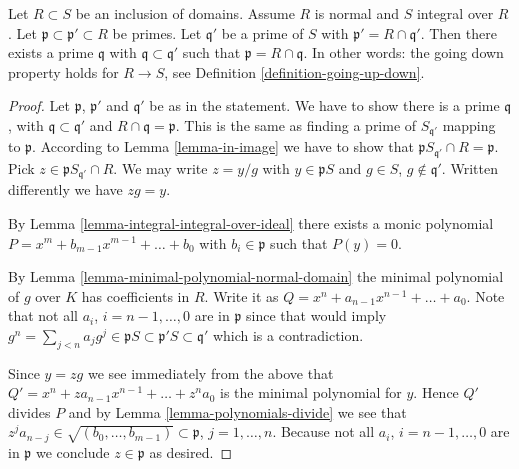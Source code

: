 \begin{proposition}
\label{proposition-going-down-normal-integral}
Let $R \subset S$ be an inclusion of domains.
Assume $R$ is normal and $S$ integral over $R$.
Let $\mathfrak p \subset \mathfrak p' \subset R$
be primes. Let $\mathfrak q'$ be a prime of $S$
with $\mathfrak p' = R \cap \mathfrak q'$.
Then there exists a prime $\mathfrak q$
with $\mathfrak q \subset \mathfrak q'$
such that $\mathfrak p = R \cap \mathfrak q$. In other words:
the going down property holds for $R \to S$, see
Definition \ref{definition-going-up-down}.
\end{proposition}

\begin{proof}
Let $\mathfrak p$, $\mathfrak p'$ and $\mathfrak q'$
be as in the statement. We have to show there is a prime
$\mathfrak q$, with $\mathfrak q \subset \mathfrak q'$ and
$R \cap \mathfrak q = \mathfrak p$. This is the same
as finding a prime of
$S_{\mathfrak q'}$ mapping to $\mathfrak p$.
According to Lemma \ref{lemma-in-image} we have to show
that $\mathfrak p S_{\mathfrak q'} \cap R
= \mathfrak p$. Pick $z \in \mathfrak p S_{\mathfrak q'} \cap R$.
We may write $z = y/g$ with $y \in \mathfrak pS$ and
$g \in S$, $g \not\in \mathfrak q'$. Written
differently we have $zg = y$.

\medskip\noindent
By Lemma \ref{lemma-integral-integral-over-ideal}
there exists a monic polynomial
$P = x^m + b_{m-1} x^{m-1} + \ldots + b_0$
with $b_i \in \mathfrak p$ such that $P(y) = 0$.

\medskip\noindent
By Lemma \ref{lemma-minimal-polynomial-normal-domain}
the minimal polynomial of $g$ over $K$ has coefficients
in $R$. Write it as $Q = x^n + a_{n-1} x^{n-1} + \ldots
+ a_0$. Note that not all $a_i$, $i = n-1, \ldots, 0$
are in $\mathfrak p$ since that would imply
$g^n = \sum_{j < n} a_j g^j \in \mathfrak pS
\subset \mathfrak p'S
\subset \mathfrak q'$
which is a contradiction.

\medskip\noindent
Since $y = zg$ we see immediately from the above
that $Q' = x^n + za_{n-1} x^{n-1} + \ldots + z^{n}a_0$
is the minimal polynomial for $y$. Hence
$Q'$ divides $P$ and by Lemma \ref{lemma-polynomials-divide}
we see that $z^ja_{n - j} \in \sqrt{(b_0, \ldots, b_{m-1})}
\subset \mathfrak p$, $j =  1, \ldots, n$.
Because not all $a_i$, $i = n-1, \ldots, 0$
are in $\mathfrak p$ we conclude $z \in \mathfrak p$
as desired.
\end{proof}